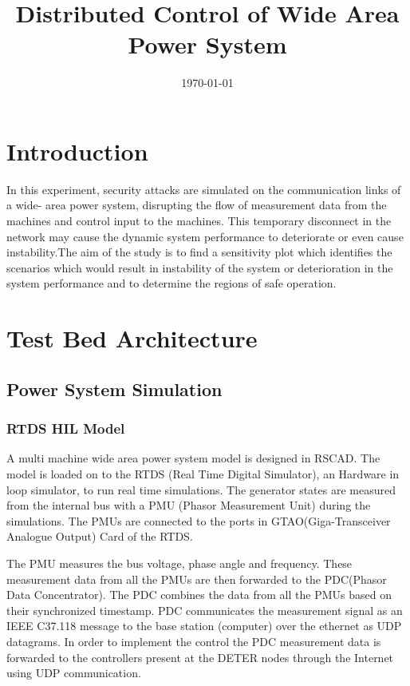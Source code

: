 \documentclass[a4paper]{article}
\title{Distributed Control of Wide Area Power System}
\author{}
\date{\today}
\begin{document}
\maketitle


\section{Introduction}
In this experiment, security attacks are simulated on the communication links of a wide- area power system, disrupting the flow of measurement data from the machines and control input to the machines. This temporary disconnect in the network may cause the dynamic system performance to deteriorate or even cause instability.The aim of the study is to find a sensitivity plot which identifies the scenarios which would result in instability of the system or deterioration in the system performance and to determine the regions of safe operation.
\section{Test Bed Architecture}
\subsection{Power System Simulation}

\subsubsection{ RTDS HIL Model}
 
A multi machine wide area power system model is designed in RSCAD. The model is loaded on to the RTDS (Real Time Digital Simulator), an Hardware in loop simulator, to run real time simulations. The generator states are measured from the internal bus with a PMU (Phasor Measurement Unit) during the simulations. The PMUs are connected to the ports in GTAO(Giga-Transceiver Analogue Output) Card of the RTDS.

The PMU measures the bus voltage, phase angle and frequency. These measurement data from all the PMUs are then forwarded to the PDC(Phasor Data Concentrator). The PDC combines the data from all the PMUs based on their synchronized timestamp. PDC communicates the measurement signal as an IEEE C37.118 message to the base station (computer) over the ethernet as UDP datagrams. In order to implement the control the PDC measurement data is forwarded to the controllers present at the DETER nodes through the Internet using UDP communication.
\end{document}
